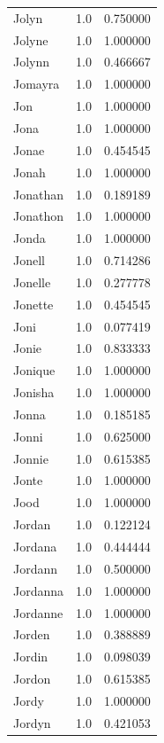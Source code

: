 \documentclass[
  letterpaper,
  DIV=11,
  numbers=noendperiod]{scrreprt}
\begin{document}
\begin{tabular}{lrr}
Jolyn           &   1.0 &   0.750000 \\
Jolyne          &   1.0 &   1.000000 \\
Jolynn          &   1.0 &   0.466667 \\
Jomayra         &   1.0 &   1.000000 \\
Jon             &   1.0 &   1.000000 \\
Jona            &   1.0 &   1.000000 \\
Jonae           &   1.0 &   0.454545 \\
Jonah           &   1.0 &   1.000000 \\
Jonathan        &   1.0 &   0.189189 \\
Jonathon        &   1.0 &   1.000000 \\
Jonda           &   1.0 &   1.000000 \\
Jonell          &   1.0 &   0.714286 \\
Jonelle         &   1.0 &   0.277778 \\
Jonette         &   1.0 &   0.454545 \\
Joni            &   1.0 &   0.077419 \\
Jonie           &   1.0 &   0.833333 \\
Jonique         &   1.0 &   1.000000 \\
Jonisha         &   1.0 &   1.000000 \\
Jonna           &   1.0 &   0.185185 \\
Jonni           &   1.0 &   0.625000 \\
Jonnie          &   1.0 &   0.615385 \\
Jonte           &   1.0 &   1.000000 \\
Jood            &   1.0 &   1.000000 \\
Jordan          &   1.0 &   0.122124 \\
Jordana         &   1.0 &   0.444444 \\
Jordann         &   1.0 &   0.500000 \\
Jordanna        &   1.0 &   1.000000 \\
Jordanne        &   1.0 &   1.000000 \\
Jorden          &   1.0 &   0.388889 \\
Jordin          &   1.0 &   0.098039 \\
Jordon          &   1.0 &   0.615385 \\
Jordy           &   1.0 &   1.000000 \\
Jordyn          &   1.0 &   0.421053 \\

\end{tabular}
\end{document}
